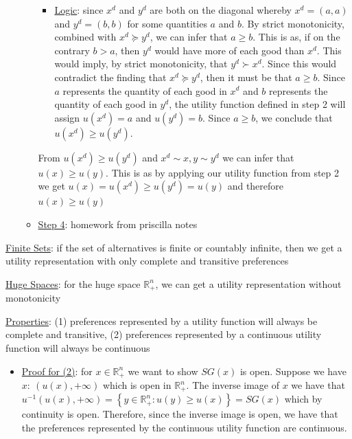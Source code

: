 \documentclass{article}
\begin{document}
\begin{itemize}
\begin{itemize}
      \begin{itemize}
        \item  \underline{Logic}: since $x^{d}$ and $y^{d}$ are both on the diagonal whereby $x^{d} = (a, a)$ and $y^{d} = (b,b)$ for some quantities $a$ and $b$. By strict monotonicity, combined with $x^{d} \succeq y^{d}$, we can infer that $a \geq b$. This is as, if on the contrary $b > a$, then $y^{d}$ would have more of each good than $x^{d}$. This would imply, by strict monotonicity, that $y^{d} \succ  x^{d}$. Since this would contradict the finding that $x^{d} \succeq y^{d}$, then it must be that $a \geq b$. Since $a$ represents the quantity of each good in $x^{d}$ and $b$ represents the quantity of each good in $y^{d}$, the utility function defined in step 2 will assign $u(x^{d}) = a$ and $u(y^{d}) = b$. Since $a \geq b$, we conclude that $u(x^{d}) \geq u(y^{d})$.
      \end{itemize}
      From $u(x^{d}) \geq u(y^{d})$ and $x^{d} \sim x, y \sim y^{d}$ we can infer that $u(x) \geq u(y)$. This is as by applying our utility function from step 2 we get $u(x) = u(x^{d}) \geq u(y^{d}) = u(y)$ and therefore $u(x) \geq u(y)$
      \item  \underline{Step 4}: \begingroup\color{blue} homework from priscilla notes \endgroup
    \end{itemize}
  \end{itemize}
  \par
  \underline{Finite Sets}: if the set of alternatives is finite or countably infinite, then we get a utility representation with only complete and transitive preferences \par
  \underline{Huge Spaces}: for the huge space $\mathbb{R}^{n}_{+}$, we can get a utility representation without monotonicity \par
  \underline{Properties}: (1) preferences represented by a utility function will always be complete and transitive, (2) preferences represented by a continuous utility function will always be continuous
  \begin{itemize}
    \item  \underline{Proof for (2)}: for $x \in \mathbb{R}^{n}_{+}$ we want to show $SG(x)$ is open. Suppose we have $x: \ (u(x), + \infty)$ which is open in $\mathbb{R}^{n}_{+}$. The inverse image of $x$ we have that $u^{-1}(u(x), + \infty) = \left\{y \in \mathbb{R}_{+}^{n}: u(y) \geq u(x) \right\} = SG(x)$ which by continuity is open. Therefore, since the inverse image is open, we have that the preferences represented by the continuous utility function are continuous.
  \end{itemize}
  \par
\vspace{6mm}
\end{document}
